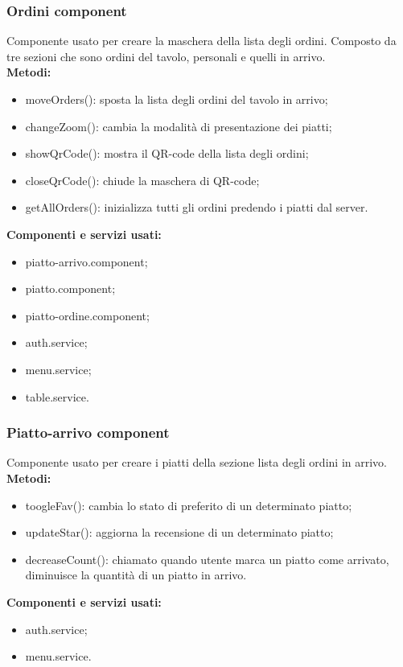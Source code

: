 \subsubsection{Ordini component}
Componente usato per creare la maschera della lista degli ordini. Composto da tre sezioni che sono ordini del tavolo, personali e quelli in arrivo.\\
\textbf{Metodi:}
\begin{itemize}
    \item moveOrders(): sposta la lista degli ordini del tavolo in arrivo;
    \item changeZoom(): cambia la modalità di presentazione dei piatti;
    \item showQrCode(): mostra il QR-code della lista degli ordini;
    \item closeQrCode(): chiude la maschera di QR-code;
    \item getAllOrders(): inizializza tutti gli ordini predendo i piatti dal server.
\end{itemize}
\textbf{Componenti e servizi usati:}
\begin{itemize}
    \item piatto-arrivo.component;
    \item piatto.component;
    \item piatto-ordine.component;
    \item auth.service;
    \item menu.service;
    \item table.service.
\end{itemize}

\subsubsection{Piatto-arrivo component}
Componente usato per creare i piatti della sezione lista degli ordini in arrivo.\\
\textbf{Metodi:}
\begin{itemize}
    \item toogleFav(): cambia lo stato di preferito di un determinato piatto;
    \item updateStar(): aggiorna la recensione di un determinato piatto;
    \item decreaseCount(): chiamato quando utente marca un piatto come arrivato, diminuisce la quantità di un piatto in arrivo.
\end{itemize}
\textbf{Componenti e servizi usati:}
\begin{itemize}
    \item auth.service;
    \item menu.service.
\end{itemize}

